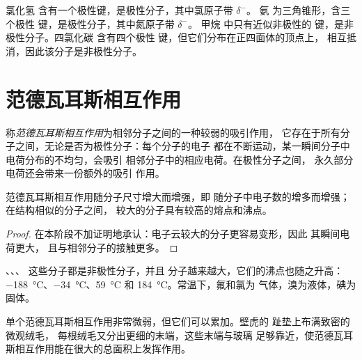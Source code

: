 \begin{example}[四种分子]\label{ex:g11:polarity-and-cohesion:four}
氯化氢  含有一个极性键，是极性分子，其中氯原子带 $\delta^-$。
氨  为三角锥形，含三个极性  键，是极性分子，其中氮原子带 $\delta^-$。
甲烷  中只有近似非极性的
 键，是非极性分子。四氯化碳  含有四个极性
 键，但它们分布在正四面体的顶点上，
相互抵消，因此该分子是非极性分子。
\end{example}

\section{范德瓦耳斯相互作用}

\begin{definition}[范德瓦耳斯相互作用]\label{def:g11:polarity-and-cohesion:van-der-waals}
称\emph{范德瓦耳斯相互作用}为相邻分子之间的一种较弱的吸引作用，
它存在于所有分子之间，无论是否为极性分子：每个分子的电子
都在不断运动，某一瞬间分子中电荷分布的不均匀，会吸引
相邻分子中的相应电荷。在极性分子之间，
永久部分电荷还会带来一份额外的吸引
作用。
\end{definition}


\begin{proposition}\label{prop:g11:polarity-and-cohesion:size}
范德瓦耳斯相互作用随分子尺寸增大而增强，即
随分子中电子数的增多而增强；在结构相似的分子之间，
较大的分子具有较高的熔点和沸点。
\end{proposition}

\begin{proof}
在本阶段不加证明地承认：电子云较大的分子更容易变形，因此
其瞬间电荷更大，
且与相邻分子的接触更多。
\end{proof}

\begin{example}[卤素]\label{ex:g11:polarity-and-cohesion:halogens}
、、、 这些分子都是非极性分子，并且
分子越来越大，它们的沸点也随之升高：
\qty{-188}{\celsius}、\qty{-34}{\celsius}、\qty{59}{\celsius} 和
\qty{184}{\celsius}。常温下，氟和氯为
气体，溴为液体，碘为固体。
\end{example}

\begin{remark}[壁虎]\label{rem:g11:polarity-and-cohesion:gecko}
单个范德瓦耳斯相互作用非常微弱，但它们可以累加。壁虎的
趾垫上布满致密的微观绒毛，
每根绒毛又分出更细的末端，这些末端与玻璃
足够靠近，使范德瓦耳斯相互作用能在很大的总面积上发挥作用。
\end{remark}

